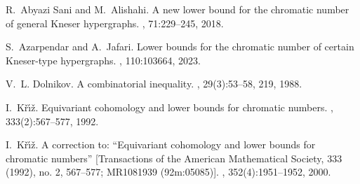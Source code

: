 R.~{Abyazi Sani} and M.~Alishahi.
\newblock A new lower bound for the chromatic number of general {K}neser
  hypergraphs.
, 71:229--245, 2018.

S.~Azarpendar and A.~Jafari.
\newblock Lower bounds for the chromatic number of certain {K}neser-type
  hypergraphs.
, 110:103664, 2023.

V.~L. Dol{\cprime}nikov.
\newblock A combinatorial inequality.
, 29(3):53--58, 219, 1988.

I.~K{\v{r}}{\'{\i}}{\v{z}}.
\newblock Equivariant cohomology and lower bounds for chromatic numbers.
,
  333(2):567--577, 1992.

I.~K{\v{r}}{\'{\i}}{\v{z}}.
\newblock A correction to: ``{E}quivariant cohomology and lower bounds for
  chromatic numbers'' [{T}ransactions of the {A}merican {M}athematical
  {S}ociety, {333} (1992), no. 2, 567--577; {MR}1081939 (92m:05085)].
,
  352(4):1951--1952, 2000.
